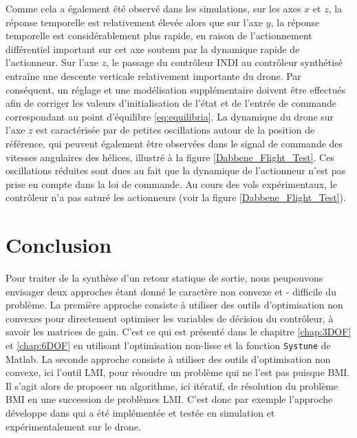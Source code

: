 Comme cela a également été observé dans les simulations, sur les axes $x$ et $z$, la réponse temporelle est relativement élevée alors que sur l'axe $y$, la réponse temporelle est considérablement plus rapide, en raison de l'actionnement différentiel important sur cet axe soutenu par la dynamique rapide de l'actionneur. Sur l'axe $z$, le passage du contrôleur INDI au contrôleur synthétisé entraîne une descente verticale relativement importante du drone. Par conséquent, un réglage et une modélisation supplémentaire doivent être effectués afin de corriger les valeurs d'initialisation de l'état et de l'entrée de commande correspondant au point d'équilibre \eqref{eq:equilibria}. La dynamique du drone sur l'axe $z$ est caractérisée par de petites oscillations autour de la position de référence, qui peuvent également être observées dans le signal de commande des vitesses angulaires des hélices, illustré à la figure \ref{Dabbene_Flight_Test}. Ces oscillations réduites sont dues au fait que la dynamique de l'actionneur n'est pas prise en compte dans la loi de commande.
Au cours des vols expérimentaux, le contrôleur n'a pas saturé les actionneurs (voir la figure \ref{Dabbene_Flight_Test}).



\section{Conclusion}

Pour traiter de la synthèse d'un retour statique de sortie, nous peupouvons envisager deux approches étant donné le caractère non convexe et - difficile du problème. La première approche consiste à utiliser des outils d'optimisation non convexes pour directement optimiser les variables de décision du contrôleur, à savoir les matrices de gain. C'est ce qui est présenté dans le chapitre \ref{chap:3DOF} et \ref{chap:6DOF} en utilisant l’optimisation  non-lisse et la fonction {\tt Systune} de Matlab. La seconde approche consiste à utiliser des outils d'optimisation non convexe, ici l'outil LMI, pour résoudre un problème qui ne l'est pas puisque BMI. Il s'agit alors de proposer un algorithme, ici itératif, de résolution du problème BMI en une succession de problèmes LMI. C'est donc par exemple l'approche développe dans \cite{Arzelier2018} qui a été implémentée et testée en simulation et expérimentalement sur le drone. 

